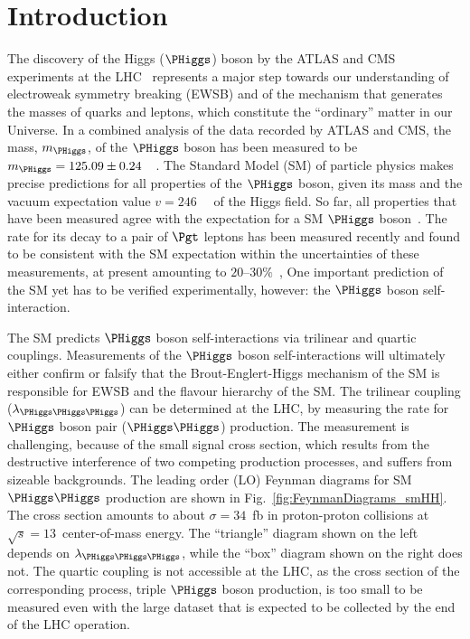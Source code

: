\section{Introduction}
\label{sec:introduction}

The discovery of the Higgs ($\PHiggs$) boson by the ATLAS and CMS experiments at the LHC~\cite{Higgs-Discovery_CMS,Higgs-Discovery_ATLAS}
represents a major step towards our understanding of electroweak symmetry breaking (EWSB) 
and of the mechanism that generates the masses of quarks and leptons, which constitute the ``ordinary'' matter in our Universe.
In a combined analysis of the data recorded by ATLAS and CMS, 
the mass, $m_{\PHiggs}$, of the $\PHiggs$ boson has been measured to be $m_{\PHiggs} = 125.09 \pm 0.24$~\GeV~\cite{HIG-14-042}.
The Standard Model (SM) of particle physics makes precise predictions for all properties of the $\PHiggs$ boson, 
given its mass and the vacuum expectation value $v=246$~\GeV~\cite{PDG} of the Higgs field.
So far, all properties that have been measured agree with the expectation for a SM $\PHiggs$ boson~\cite{HIG-15-002}.
The rate for its decay to a pair of $\Pgt$ leptons has been measured recently
and found to be consistent with the SM expectation within the uncertainties of these measurements, 
at present amounting to $20$--$30\%$~\cite{HIG-13-004,Aad:2015vsa,HIG-15-002,HIG-16-043,ATLAS:2018lur},
One important prediction of the SM yet has to be verified experimentally, however:
the $\PHiggs$ boson self-interaction.

The SM predicts $\PHiggs$ boson self-interactions via trilinear and quartic couplings. 
Measurements of the $\PHiggs$ boson self-interactions will ultimately either confirm or falsify 
that the Brout-Englert-Higgs mechanism of the SM is responsible for EWSB
and the flavour hierarchy of the SM. 
The trilinear coupling ($\lambda_{\PHiggs\PHiggs\PHiggs}$) can be determined at the LHC, 
by measuring the rate for $\PHiggs$ boson pair ($\PHiggs\PHiggs$) production. 
The measurement is challenging, because of the small signal cross section, 
which results from the destructive interference of two competing production processes, and suffers from sizeable backgrounds. 
The leading order (LO) Feynman diagrams for SM $\PHiggs\PHiggs$ production are shown in Fig.~\ref{fig:FeynmanDiagrams_smHH}.
The cross section amounts to about $\sigma = 34$~fb in proton-proton collisions at $\sqrt{s}=13$~\TeV center-of-mass energy.
The ``triangle'' diagram shown on the left depends on $\lambda_{\PHiggs\PHiggs\PHiggs}$,
while the ``box'' diagram shown on the right does not.
The quartic coupling is not accessible at the LHC, as the cross section of the corresponding process, 
triple $\PHiggs$ boson production, is too small to be measured
even with the large dataset that is expected to be collected by the end of the LHC operation.

